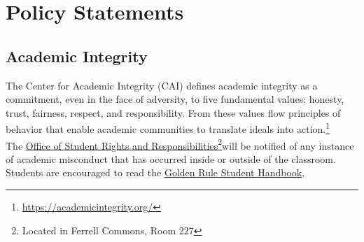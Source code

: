 \documentclass[11pt]{paper}
\begin{document}
\section{Policy Statements}
\subsection{Academic Integrity}
The Center for Academic Integrity (CAI) defines academic integrity as a commitment, even in the face of adversity, to five fundamental values: honesty, trust, fairness, respect, and responsibility. From these values flow principles of behavior that enable academic communities to translate ideals into action.\footnote{\url{https://academicintegrity.org/}}\\

The \href{https://osrr.sdes.ucf.edu/}{Office of Student Rights and Responsibilities}\footnote{Located in Ferrell Commons, Room 227}will be notified of any instance of academic misconduct that has occurred inside or outside of the classroom. Students are encouraged to read the \href{https://goldenrule.sdes.ucf.edu/}{Golden Rule Student Handbook}.\\
\end{document}
